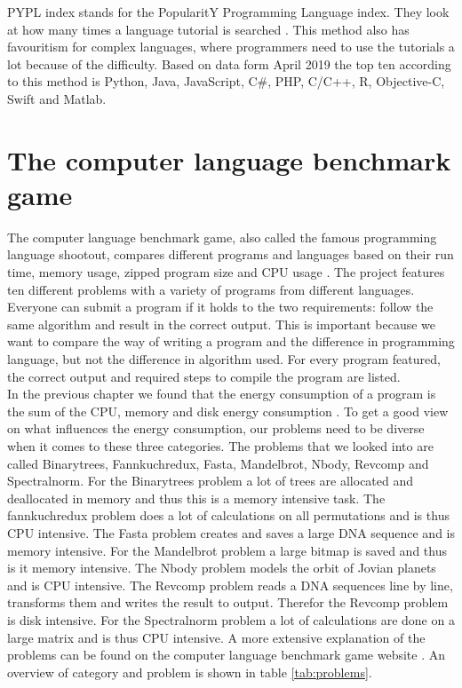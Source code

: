 PYPL index stands for the PopularitY Programming Language index. They look at how many times a language tutorial is searched \cite{car:2019}. This method also has favouritism for complex languages, where programmers need to use the tutorials a lot because of the difficulty. Based on data form April 2019 the top ten according to this method is Python, Java, JavaScript, C\#, PHP, C/C++, R, Objective-C, Swift and Matlab.\\

\section{The computer language benchmark game}
The computer language benchmark game, also called the famous programming language shootout, compares different programs and languages based on their run time, memory usage, zipped program size and CPU usage \cite{gouy:2019}. The project features ten different problems with a variety of programs from different languages. Everyone can submit a program if it holds to the two requirements: follow the same algorithm and result in the correct output. This is important because we want to compare the way of writing a program and the difference in programming language, but not the difference in algorithm used. For every program featured, the correct output and required steps to compile the program are listed.\\

In the previous chapter we found that the energy consumption of a program is the sum of the CPU, memory and disk energy consumption \cite{acar2016impact}. To get a good view on what influences the energy consumption, our problems need to be diverse when it comes to these three categories. The problems that we looked into are called Binarytrees, Fannkuchredux, Fasta, Mandelbrot, Nbody, Revcomp and Spectralnorm. For the Binarytrees problem a lot of trees are allocated and deallocated in memory and thus this is a memory intensive task. The fannkuchredux problem does a lot of calculations on all permutations and is thus CPU intensive. The Fasta problem creates and saves a large DNA sequence and is memory intensive. For the Mandelbrot problem a large bitmap is saved and thus is it memory intensive. The Nbody problem models the orbit of Jovian planets and is CPU intensive. The Revcomp problem reads a DNA sequences line by line, transforms them and writes the result to output. Therefor the Revcomp problem is disk intensive. For the Spectralnorm problem a lot of calculations are done on a large matrix and is thus CPU intensive. A more extensive explanation of the problems can be found on the computer language benchmark game website \cite{gouy:2019}. An overview of category and problem is shown in table \ref{tab:problems}.

